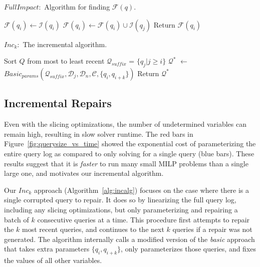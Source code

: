 \begin{algorithm}[t]
\scriptsize
\caption{$FullImpact:$ Algorithm for finding $\mathcal{F}(q)$.}
\label{alg:fullimpact}
\begin{algorithmic}[2]
\STATE $\mathcal{F}(q_i) \leftarrow \mathcal{I}(q_i)$
\STATE $\mathcal{F}(q_i) \leftarrow \mathcal{F}(q_i) \cup \mathcal{I}(q_j)$
\ENDIF
\ENDFOR
\STATE Return $\mathcal{F}(q_i)$
\end{algorithmic}
\end{algorithm}

\begin{algorithm}[t]
\caption{$Inc_k:$ The incremental algorithm. 
}
\scriptsize
\label{alg:incalg}
\begin{algorithmic}[2]
\STATE Sort $Q$ from most to least recent
  \STATE $\mathcal{Q}_{suffix}$ = $\{q_j | j \ge i \}$ 
  \STATE $\mathcal{Q}^*$ $\leftarrow$ $Basic_{params}(\mathcal{Q}_{suffix}, \mathcal{D}_j, \mathcal{D}_n, \mathcal{C}, \{q_i, q_{i+k}\})$
    \STATE Return $\mathcal{Q}^*$
  \ENDIF
\ENDFOR
\end{algorithmic}
\end{algorithm}

\subsection{Incremental Repairs}\label{sec:incremental}



Even with the slicing optimizations, the number of undetermined variables can remain high, resulting in slow solver runtime.  
The red bars in Figure~\ref{fig:querysize_vs_time} showed the exponential cost of parameterizing the entire query log as compared to only solving for a single query (blue bars).
These results suggest that it is \emph{faster} to run many small MILP problems than a single large one, and motivates our incremental algorithm.

Our \emph{$Inc_k$} approach (Algorithm~\ref{alg:incalg}) focuses on the case where there is a single corrupted query to repair.
It does so by linearizing the full query log, including any slicing optimizations, but only parameterizing and repairing a batch of $k$ consecutive queries at a time. 
This procedure first attempts to repair the $k$ most recent queries, and continues to the next $k$ queries if a repair was not generated.
The algorithm internally calls a modified version of the \emph{basic} approach that takes extra parameters $\{q_i, q_{i+k}\}$, only parameterizes those queries, and fixes the values of all other variables.

